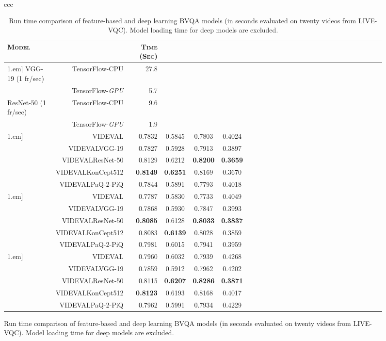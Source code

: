 \documentclass[journal]{IEEEtran}
\begin{document}
\begin{figure}[!t]
\begin{tabular}{ccc}
\begin{table}[!t]
\setlength{\tabcolsep}{4pt}
\renewcommand{\arraystretch}{1.1}
\centering
\caption{{Run time comparison of feature-based and deep learning BVQA models (in seconds evaluated on twenty  videos from LIVE-VQC). Model loading time for deep models are excluded}.}
\label{table:time_dl}
\begin{tabular}{lrrccccccccccccccccccccccc}
\toprule
\textsc{Model} &  & \textsc{Time (Sec)} \\ \hline\-1.em]
VGG-19 (1 fr/sec) & TensorFlow-CPU  & 27.8 \\
                & TensorFlow-\textit{GPU} & 5.7 \\
ResNet-50 (1 fr/sec) & TensorFlow-CPU  & 9.6 \\
                & TensorFlow-\textit{GPU} & 1.9 \\
\hline\-1.em]
\multirow{5}{*}{KoNViD} & 
VIDEVAL  & 0.7832 & 0.5845 & 0.7803 & 0.4024 \\
& VIDEVALVGG-19 & 0.7827 & 0.5928 & 0.7913 & 0.3897   \\
& VIDEVALResNet-50 & 0.8129 & 0.6212 & \textbf{0.8200} & \textbf{0.3659} \\
& VIDEVALKonCept512  & \textbf{0.8149} & \textbf{0.6251} & 0.8169 & 0.3670  \\
& VIDEVALPaQ-2-PiQ  & 0.7844 & 0.5891 & 0.7793 & 0.4018  \\
\hline\-1.em]
\multirow{5}{*}{YT-UGC} & 
VIDEVAL  & 0.7787 & 0.5830 & 0.7733 & 0.4049 \\
& VIDEVALVGG-19 & 0.7868 & 0.5930 & 0.7847 & 0.3993  \\
& VIDEVALResNet-50 & \textbf{0.8085} & 0.6128 & \textbf{0.8033} & \textbf{0.3837} \\
& VIDEVALKonCept512 & 0.8083 & \textbf{0.6139} & 0.8028 & 0.3859 \\
& VIDEVALPaQ-2-PiQ & 0.7981 & 0.6015 & 0.7941 & 0.3959  \\

\hline\-1.em]
\multirow{5}{*}{All-Comb} &
VIDEVAL  & 0.7960 & 0.6032 & 0.7939 & 0.4268 \\
& VIDEVALVGG-19 & 0.7859 & 0.5912 & 0.7962 & 0.4202   \\
& VIDEVALResNet-50 & 0.8115 & \textbf{0.6207} & \textbf{0.8286} & \textbf{0.3871} \\
& VIDEVALKonCept512 & \textbf{0.8123} & 0.6193  & 0.8168  & 0.4017  \\
& VIDEVALPaQ-2-PiQ & 0.7962  & 0.5991 & 0.7934  & 0.4229 \\


\end{tabular}
\end{table}
\end{tabular}
\end{figure}
\end{document}
